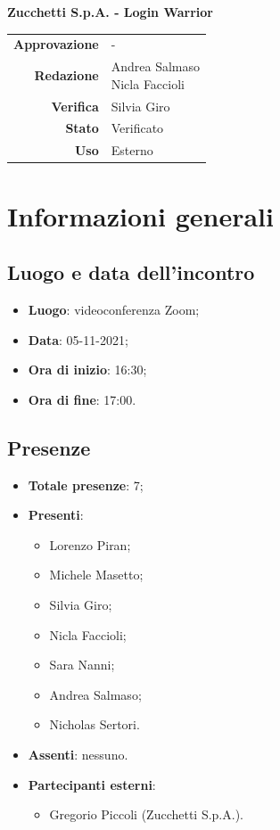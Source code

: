 \documentclass[11pt]{article}
\begin{document}
\begin{titlepage}
\begin{center}
			\large
			\textbf{Zucchetti S.p.A. - Login Warrior}\\
			
			\vfill
			
			\begin{tabular}{r|l}
				\textbf{Approvazione} &  -\\
				\textbf{Redazione} &  \parbox[t]{3.5cm}{Andrea Salmaso \\Nicla Faccioli}\\
				\textbf{Verifica} &  Silvia Giro\\
				\textbf{Stato} & Verificato \\
				\textbf{Uso} & Esterno
			\end{tabular}
			\vfill
			
		\end{center}
	\end{titlepage}

	\newpage

	\section{Informazioni generali}
	\subsection{Luogo e data dell'incontro}
	\begin{itemize}
		\item \textbf{Luogo}: videoconferenza Zoom;
		\item \textbf{Data}: 05-11-2021;
		\item \textbf{Ora di inizio}: 16:30;
		\item \textbf{Ora di fine}: 17:00.
	\end{itemize}
	
	\subsection{Presenze}
	\begin{itemize}
		\item \textbf{Totale presenze}: 7;
		\item \textbf{Presenti}:
		\begin{itemize}
			\item Lorenzo Piran;
			\item Michele Masetto;
			\item Silvia Giro;
			\item Nicla Faccioli;
			\item Sara Nanni;
			\item Andrea Salmaso;
			\item Nicholas Sertori.
		\end{itemize}
		\item \textbf{Assenti}: nessuno.
		\item \textbf{Partecipanti esterni}:
		\begin{itemize}
			\item Gregorio Piccoli (Zucchetti S.p.A.).
		\end{itemize}
	\end{itemize}
\end{document}

